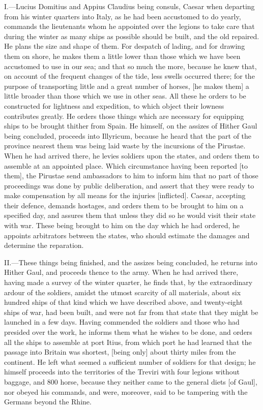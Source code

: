 I.—Lucius Domitius and Appius Claudius being consuls, Caesar when
departing from his winter quarters into Italy, as he had been accustomed
to do yearly, commands the lieutenants whom he appointed over the
legions to take care that during the winter as many ships as possible
should be built, and the old repaired. He plans the size and shape of
them. For despatch of lading, and for drawing them on shore, he makes
them a little lower than those which we have been accustomed to use in
our sea; and that so much the more, because he knew that, on account of
the frequent changes of the tide, less swells occurred there; for the
purpose of transporting little and a great number of horses, [he makes
them] a little broader than those which we use in other seas. All these
he orders to be constructed for lightness and expedition, to which
object their lowness contributes greatly. He orders those things which
are necessary for equipping ships to be brought thither from Spain. He
himself, on the assizes of Hither Gaul being concluded, proceeds into
Illyricum, because he heard that the part of the province nearest them
was being laid waste by the incursions of the Pirustae. When he had
arrived there, he levies soldiers upon the states, and orders them to
assemble at an appointed place. Which circumstance having been reported
[to them], the Pirustae send ambassadors to him to inform him that no
part of those proceedings was done by public deliberation, and assert
that they were ready to make compensation by all means for the injuries
[inflicted]. Caesar, accepting their defence, demands hostages, and
orders them to be brought to him on a specified day, and assures them
that unless they did so he would visit their state with war. These being
brought to him on the day which he had ordered, he appoints arbitrators
between the states, who should estimate the damages and determine the
reparation.

II.—These things being finished, and the assizes being concluded, he
returns into Hither Gaul, and proceeds thence to the army. When he had
arrived there, having made a survey of the winter quarter, he finds
that, by the extraordinary ardour of the soldiers, amidst the utmost
scarcity of all materials, about six hundred ships of that kind which we
have described above, and twenty-eight ships of war, had been built, and
were not far from that state that they might be launched in a few days.
Having commended the soldiers and those who had presided over the work,
he informs them what he wishes to be done, and orders all the ships to
assemble at port Itius, from which port he had learned that the passage
into Britain was shortest, [being only] about thirty miles from the
continent. He left what seemed a sufficient number of soldiers for that
design; he himself proceeds into the territories of the Treviri with
four legions without baggage, and 800 horse, because they neither came
to the general diets [of Gaul], nor obeyed his commands, and were,
moreover, said to be tampering with the Germans beyond the Rhine.

